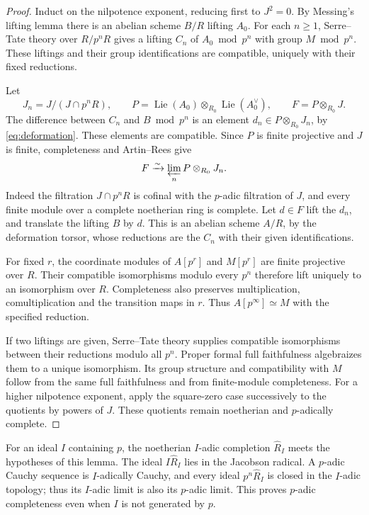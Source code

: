 \documentclass[11pt]{article}
\theoremstyle{definition}\newtheorem{definition}[theorem]{Definition}
\theoremstyle{remark}\newtheorem{remark}[theorem]{Remark}
\newcommand{\Lie}{\operatorname{Lie}}
\begin{document}
\begin{proof}
Induct on the nilpotence exponent, reducing first to $J^2=0$. By Messing's lifting lemma there is an abelian scheme $B/R$ lifting $A_0$. For each $n\geq1$, Serre--Tate theory over $R/p^nR$ gives a lifting $C_n$ of
$A_0\bmod p^n$ with group $M\bmod p^n$. These liftings and their group identifications are compatible, uniquely with their fixed reductions.

Let
\[
 J_n=J/(J\cap p^nR),\qquad
 P=\Lie(A_0)\otimes_{R_0}\Lie(A_0^\vee),\qquad F=P\otimes_{R_0}J.
\]
The difference between $C_n$ and $B\bmod p^n$ is an element
$d_n\in P\otimes_{R_0}J_n$, by \eqref{eq:deformation}. These elements are compatible. Since $P$ is finite projective and $J$ is finite, completeness and Artin--Rees give
\[
 F\xrightarrow{\sim}\varprojlim_n P\otimes_{R_0}J_n.
\]
Indeed the filtration $J\cap p^nR$ is cofinal with the $p$-adic filtration of $J$, and every finite module over a complete noetherian ring is complete. Let $d\in F$ lift the $d_n$, and translate the lifting $B$ by $d$. This is an abelian scheme $A/R$, by the deformation torsor, whose reductions are the $C_n$ with their given identifications.

For fixed $r$, the coordinate modules of $A[p^r]$ and $M[p^r]$ are finite projective over $R$. Their compatible isomorphisms modulo every $p^n$ therefore lift uniquely to an isomorphism over $R$. Completeness also preserves multiplication, comultiplication and the transition maps in $r$. Thus $A[p^\infty]\simeq M$ with the specified reduction.

If two liftings are given, Serre--Tate theory supplies compatible isomorphisms between their reductions modulo all $p^n$. Proper formal full faithfulness \citep[Theorem~5.4.1, pp.~156--157]{EGAIII} algebraizes them to a unique isomorphism. Its group structure and compatibility with $M$ follow from the same full faithfulness and from finite-module completeness. For a higher nilpotence exponent, apply the square-zero case successively to the quotients by powers of $J$. These quotients remain noetherian and $p$-adically complete.
\end{proof}

For an ideal $I$ containing $p$, the noetherian $I$-adic completion $\widehat R_I$ meets the hypotheses of this lemma. The ideal $I\widehat R_I$ lies in the Jacobson radical. A $p$-adic Cauchy sequence is $I$-adically Cauchy, and every ideal $p^n\widehat R_I$ is closed in the $I$-adic topology; thus its $I$-adic limit is also its $p$-adic limit. This proves $p$-adic completeness even when $I$ is not generated by $p$.
\end{document}
